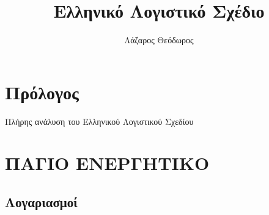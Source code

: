 \documentclass[A4,10pt,greek]{book}
\title{Ελληνικό Λογιστικό Σχέδιο}
\author{Λάζαρος Θεόδωρος}
\begin{document}
\maketitle

\tableofcontents

\frontmatter
\chapter{Πρόλογος}
Πλήρης ανάλυση του Ελληνικού Λογιστικού Σχεδίου

\mainmatter
\chapter{ΠΑΓΙΟ ΕΝΕΡΓΗΤΙΚΟ}
\section{Λογαριασμοί}
\noindent
\end{document}
